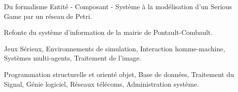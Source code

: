 \documentclass[10pt,a4paper]{altacv}
\begin{document}
\divider

Du formalisme Entité - Composant - Système à la modélisation d’un Serious Game par un réseau de Petri.

\divider

Refonte du système d'information de la mairie de Pontault-Combault.


Jeux Sérieux, Environnements de simulation, Interaction homme-machine, Systèmes multi-agents, Traitement de l'image.

\divider

Programmation structurelle et orienté objet, Base de données, Traitement du Signal, Génie logiciel, Réseaux télécoms, Administration système. 


\medskip



\clearpage







\end{document}
